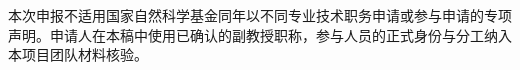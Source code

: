 \justifying
\NSFCBodyText

本次申报不适用国家自然科学基金同年以不同专业技术职务申请或参与申请的专项声明。申请人在本稿中使用已确认的副教授职称，参与人员的正式身份与分工纳入本项目团队材料核验。
